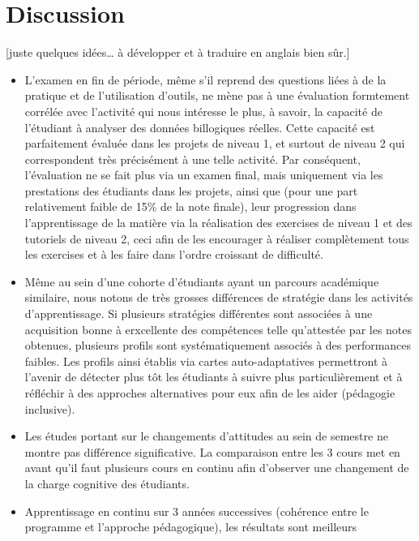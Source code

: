 \documentclass[
]{article}
\begin{document}
\hypertarget{discussion}{%
\section{Discussion}\label{discussion}}

{[}juste quelques idées\ldots{} à développer et à traduire en anglais
bien sûr.{]}

\begin{itemize}
\item
  L'examen en fin de période, même s'il reprend des questions liées à de
  la pratique et de l'utilisation d'outils, ne mène pas à une évaluation
  formtement corrélée avec l'activité qui nous intéresse le plus, à
  savoir, la capacité de l'étudiant à analyser des données billogiques
  réelles. Cette capacité est parfaitement évaluée dans les projets de
  niveau 1, et surtout de niveau 2 qui correspondent très précisément à
  une telle activité. Par conséquent, l'évaluation ne se fait plus via
  un examen final, mais uniquement via les prestations des étudiants
  dans les projets, ainsi que (pour une part relativement faible de 15\%
  de la note finale), leur progression dans l'apprentissage de la
  matière via la réalisation des exercises de niveau 1 et des tutoriels
  de niveau 2, ceci afin de les encourager à réaliser complètement tous
  les exercises et à les faire dans l'ordre croissant de difficulté.
\item
  Même au sein d'une cohorte d'étudiants ayant un parcours académique
  similaire, nous notons de très grosses différences de stratégie dans
  les activités d'apprentissage. Si plusieurs stratégies différentes
  sont associées à une acquisition bonne à erxcellente des compétences
  telle qu'attestée par les notes obtenues, plusieurs profils sont
  systématiquement associés à des performances faibles. Les profils
  ainsi établis via cartes auto-adaptatives permettront à l'avenir de
  détecter plus tôt les étudiants à suivre plus particulièrement et à
  réfléchir à des approches alternatives pour eux afin de les aider
  (pédagogie inclusive).
\item
  Les études portant sur le changements d'attitudes au sein de semestre
  ne montre pas différence significative. La comparaison entre les 3
  cours met en avant qu'il faut plusieurs cours en continu afin
  d'observer une changement de la charge cognitive des étudiants.
\item
  Apprentissage en continu sur 3 années successives (cohérence entre le
  programme et l'approche pédagogique), les résultats sont meilleurs

\end{itemize}
\end{document}
